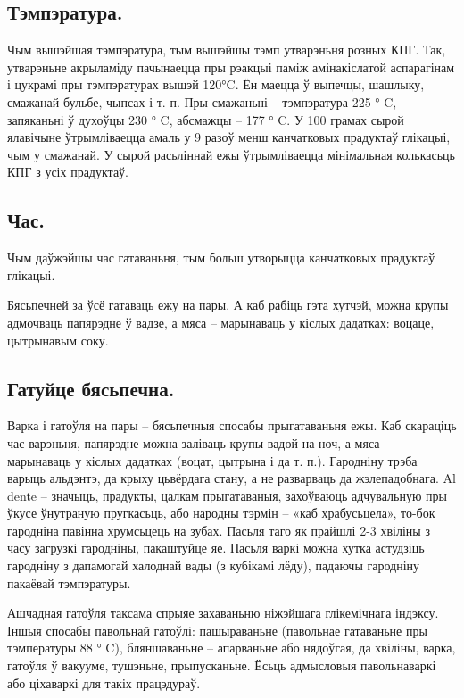 \subsection{Тэмпэратура.}
Чым вышэйшая тэмпэратура, тым вышэйшы тэмп утварэньня розных КПГ. Так, утварэньне акрыламіду пачынаецца пры рэакцыі паміж амінакіслатой аспарагінам і цукрамі пры тэмпэратурах вышэй 120°C. Ён маецца ў выпечцы, шашлыку, смажанай бульбе, чыпсах і т. п. Пры смажаньні – тэмпэратура 225 ° C, запяканьні ў духоўцы 230 ° C, абсмажцы – 177 ° C. У 100 грамах сырой ялавічыне ўтрымліваецца амаль у 9 разоў менш канчатковых прадуктаў глікацыі, чым у смажанай. У сырой расьліннай ежы ўтрымліваецца мінімальная колькасьць КПГ з усіх прадуктаў.

\subsection{Час.}
Чым даўжэйшы час гатаваньня, тым больш утворыцца канчатковых прадуктаў глікацыі.

Бясьпечней за ўсё гатаваць ежу на пары. А каб рабіць гэта хутчэй, можна крупы адмочваць папярэдне ў вадзе, а мяса – марынаваць у кіслых дадатках: воцаце, цытрынавым соку.

\subsection{Гатуйце бясьпечна.}
Варка і гатоўля на пары – бясьпечныя спосабы прыгатаваньня ежы. Каб скараціць час варэньня, папярэдне можна заліваць крупы вадой на ноч, а мяса – марынаваць у кіслых дадатках (воцат, цытрына і да т. п.). Гародніну трэба варыць альдэнтэ, да крыху цьвёрдага стану, а не разварваць да жэлепадобнага. Al dente – значыць, прадукты, цалкам прыгатаваныя, захоўваюць адчувальную пры ўкусе ўнутраную пругкасьць, або народны тэрмін – «каб храбусьцела», то-бок гародніна павінна хрумсьцець на зубах. Пасьля таго як прайшлі 2-3 хвіліны з часу загрузкі гародніны, пакаштуйце яе. Пасьля варкі можна хутка астудзіць гародніну з дапамогай халоднай вады (з кубікамі лёду), падаючы гародніну пакаёвай тэмпэратуры.

Ашчадная гатоўля таксама спрыяе захаваньню ніжэйшага глікемічнага індэксу. Іншыя спосабы павольнай гатоўлі: пашыраваньне (павольнае гатаваньне пры тэмпературы 88 ° C), бляншаваньне – апарваньне або нядоўгая, да хвіліны, варка, гатоўля ў вакууме, тушэньне, прыпусканьне. Ёсьць адмысловыя павольнаваркі або ціхаваркі для такіх працэдураў.

